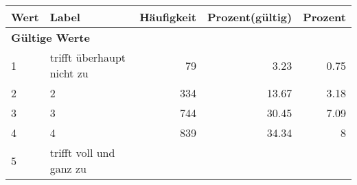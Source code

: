      \begin{longtable}{lXrrr}
     \toprule
     \textbf{Wert} & \textbf{Label} & \textbf{Häufigkeit} & \textbf{Prozent(gültig)} & \textbf{Prozent} \\
     \endhead
     \midrule
     \multicolumn{5}{l}{\textbf{Gültige Werte}}\\

     1 &
     \multicolumn{1}{X}{ trifft überhaupt nicht zu   } &


       \num{79} &
       \num[round-mode=places,round-precision=2]{3,23} &
         \num[round-mode=places,round-precision=2]{0,75} \\

     2 &
     \multicolumn{1}{X}{ 2   } &


       \num{334} &
       \num[round-mode=places,round-precision=2]{13,67} &
         \num[round-mode=places,round-precision=2]{3,18} \\

     3 &
     \multicolumn{1}{X}{ 3   } &


       \num{744} &
       \num[round-mode=places,round-precision=2]{30,45} &
         \num[round-mode=places,round-precision=2]{7,09} \\

     4 &
     \multicolumn{1}{X}{ 4   } &


       \num{839} &
       \num[round-mode=places,round-precision=2]{34,34} &
         \num[round-mode=places,round-precision=2]{8} \\

     5 &
     \multicolumn{1}{X}{ trifft voll und ganz zu   } &



\end{longtable}
